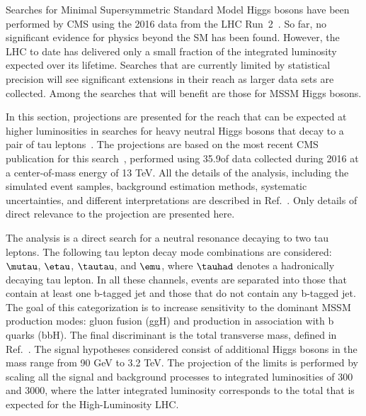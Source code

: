 Searches for Minimal Supersymmetric Standard Model  Higgs bosons have been performed by CMS using
the 2016 data from the LHC Run~2~\cite{HIG-18-014,HIG-16-018,HIG-17-020}.
So far,
no significant evidence for physics beyond the SM has been found.
However, the LHC to date has delivered only a small fraction of the
integrated luminosity expected over its lifetime.
Searches that are currently limited by statistical precision
will see significant extensions in their reach as larger data sets are collected.
Among the searches that will benefit are those for MSSM Higgs bosons.

In this section,
projections are presented for the reach that can be expected at higher luminosities
in searches for heavy neutral Higgs bosons that decay to a pair of tau leptons~\cite{CMS-PAS-FTR-18-017}.
The projections are based on the most recent CMS publication
for this search~\cite{HIG-17-020},
performed using 35.9\fbinv of data collected during 2016
at a center-of-mass energy of 13 TeV.
All the details of the analysis,
including the simulated event samples, background estimation methods,
systematic uncertainties, and different interpretations are described in Ref.~\cite{HIG-17-020}.
Only details of direct relevance to the projection are presented here.

The analysis is a direct search for a neutral resonance
decaying to two tau leptons.
The following tau lepton decay mode combinations are considered: $\mutau$, $\etau$,
$\tautau$, and $\emu$, where $\tauhad$ denotes a hadronically decaying tau lepton.
In all these channels, events are separated into those that contain
at least one b-tagged jet and those that do not contain any b-tagged jet. 
The goal of this categorization is to increase sensitivity to the dominant MSSM production modes: 
gluon fusion (ggH) and production in association with b quarks (bbH).
The final discriminant is the total 
transverse mass, defined in Ref.~\cite{HIG-17-020}.
The signal hypotheses considered consist of additional Higgs
bosons in the mass range from 90 GeV to 3.2 TeV.
The projection of the limits %
is performed by scaling all the signal
and background processes to integrated luminosities
of 300 and 3000\fbinv,
where the latter integrated luminosity corresponds to the total that is
expected for the High-Luminosity LHC. 


